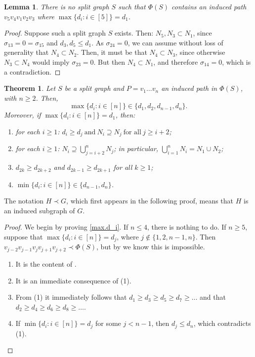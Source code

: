\documentclass[11pt]{elsarticle}
\newtheorem{theorem}{Theorem}[section]
\newtheorem{lemma}[lemma]{Lemma}
\begin{document}
\begin{lemma}
	\label{no.existe.Phi=P_5.tal.que...}
	There is no split graph $S$ such that $\Phi(S)$ contains an induced path $v_5 v_4 v_1 v_2 v_3$ where $\max\{ d_i:i\in[5]\}=d_1$.
\end{lemma}

\begin{proof}
	Suppose such a split graph $S$ exists. Then: $N_5,N_3\subset N_1$, since $\sigma_{13}=0=\sigma_{15}$ and $d_3,d_5\leq d_1$. As $\sigma_{24}=0$, we can assume without loss of generality that $N_4\subset N_2$. Then, it must be that $N_4\subset N_3$, since otherwise $N_3\subset N_4$ would imply $\sigma_{23}=0$. But then $N_4\subset N_1$, and therefore $\sigma_{14}=0$, which is a contradiction.
\end{proof}

\begin{theorem}
	\label{caminos.inducidos.en.Phi}
	Let $S$ be a split graph and $P=v_1\ldots v_n$ an induced path in $\Phi(S)$, with $n\geq 2$. Then,
	\begin{equation}
		\max\{ d_i:i\in[n] \}\in\{d_1,d_2,d_{n-1},d_n\}.
		\label{max.d_i}
	\end{equation}
	Moreover, if $\max\{ d_i:i\in[n] \}=d_1$, then:
	\begin{enumerate}
		\item for each $i\geq 1$: $d_i\geq d_j \ \text{and} \ N_i\supseteq N_j \ \text{for all} \ j\geq i+2$;
		\item for each $i\geq 1$: $N_i\supseteq\bigcup_{j= i+2}^n N_j$; in particular, $\bigcup_{i=1}^n N_i=N_1\cup N_2$;
		\item $d_{2k}\geq d_{2k+2}$ and $d_{2k-1}\geq d_{2k+1}$ for all $k\geq 1$;
		\item $\min\{ d_i:i\in[n] \}\in\{d_{n-1},d_n\}$.
	\end{enumerate} 
\end{theorem}

The notation $H\prec G$, which first appears in the following proof, means that $H$ is an induced subgraph of $G$.

\begin{proof}
	We begin by proving \eqref{max.d_i}. If $n\leq 4$, there is nothing to do. If $n\geq 5$, suppose that $\max\{ d_i:i\in[n] \}=d_j$, where $j\notin\{1,2,n-1,n\}$. Then $v_{j-2}v_{j-1}v_jv_{j+1}v_{j+2}\prec \Phi(S)$, but by  we know this is impossible. 
	\begin{enumerate}[(1).]
		\item It is the content of .
		\item It is an immediate consequence of (1).
		\item From (1) it immediately follows that $d_1\geq d_3\geq d_5\geq d_7\geq\ldots$ and that $d_2\geq d_4\geq d_6\geq d_8\geq\ldots$.
		\item If $\min\{ d_i:i\in[n] \}=d_j$ for some $j<n-1$, then $d_j\leq d_n$, which contradicts (1).
	\end{enumerate}  
\end{proof}
\end{document}
